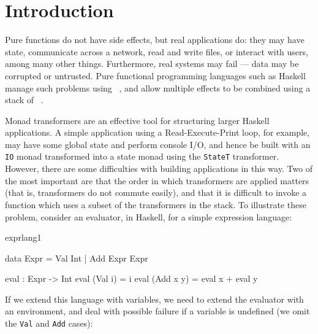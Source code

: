 \section{Introduction}


Pure functions do not have side effects, but real applications do:
they may have state, communicate across a network, read and write files, 
or interact with users, among many other things. Furthermore, real systems
may fail --- data may be corrupted or untrusted. Pure functional programming
languages such as Haskell~\cite{Haskell98} manage such problems using
~\cite{Wadler1995}, and allow multiple effects to be combined
using a stack of ~\cite{Liang1995}.

Monad transformers are an effective tool for structuring larger Haskell
applications. A simple application using a Read-Execute-Print loop,
for example, may have some global state and perform console I/O, and hence
be built with an \texttt{IO} monad transformed into a state monad
using the \texttt{StateT} transformer. However, there are some difficulties
with building applications in this way. Two of the most important
are that the order in which transformers are applied matters (that is, 
transformers do not commute easily), and that it is difficult to invoke a
function which uses a subset of the transformers in the stack.
To illustrate these problem, consider an evaluator, in Haskell, for a 
simple expression language:

\begin{SaveVerbatim}{exprlang1}

data Expr = Val Int | Add Expr Expr

eval : Expr -> Int
eval (Val i) = i
eval (Add x y) = eval x + eval y

\end{SaveVerbatim}

\noindent
If we extend this language with variables, we need to extend the evaluator
with an environment, and deal with possible failure if a variable is undefined
(we omit the \texttt{Val} and \texttt{Add} cases):

